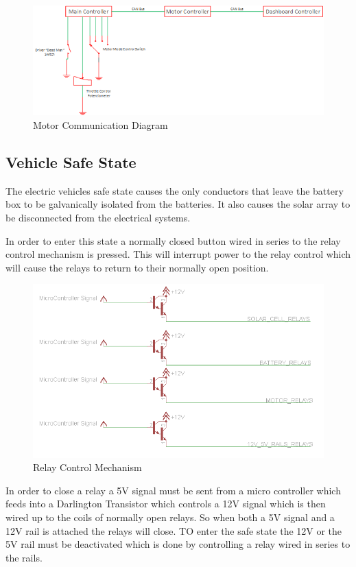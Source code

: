 \begin{figure}[H]
\includegraphics[width=\columnwidth]{figures/MotorControlDiagram.png}%
\caption{Motor Communication Diagram}
\label{Fig:MotorControl}
\end{figure}

\subsection{Vehicle Safe State}
The electric vehicles safe state causes the only conductors that leave the battery box to be galvanically isolated from the batteries. It also causes the solar array to be disconnected from the electrical systems. 

In order to enter this state a normally closed button wired in series to the relay control mechanism is pressed. This will interrupt power to the relay control which will cause the relays to return to their normally open position.

\begin{figure}[H]
\includegraphics[width=\columnwidth]{figures/RelayControl.png}%
\caption{Relay Control Mechanism}
\label{Fig:RelayControl}
\end{figure}

In order to close a relay a 5V signal must be sent from a micro controller which feeds into a Darlington Transistor which controls a 12V signal which is then wired up to the coils of normally open relays. So when both a 5V signal and a 12V rail is attached the relays will close. TO enter the safe state the 12V or the 5V rail must be deactivated which is done by controlling a relay wired in series to the rails.

